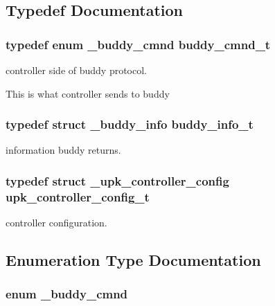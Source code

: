 \subsection{Typedef Documentation}
\subsubsection[{buddy\_\-cmnd\_\-t}]{\setlength{\rightskip}{0pt plus 5cm}typedef enum {\bf \_\-buddy\_\-cmnd}  {\bf buddy\_\-cmnd\_\-t}}\label{group__controller_ga535b2f2f45016f1d808a74f3ea665816}


controller side of buddy protocol. 

This is what controller sends to buddy 
\subsubsection[{buddy\_\-info\_\-t}]{\setlength{\rightskip}{0pt plus 5cm}typedef struct {\bf \_\-buddy\_\-info} {\bf buddy\_\-info\_\-t}}\label{group__controller_ga6036c7d3d9131044bcf5a6f7a79106f5}


information buddy returns. 

\subsubsection[{upk\_\-controller\_\-config\_\-t}]{\setlength{\rightskip}{0pt plus 5cm}typedef struct {\bf \_\-upk\_\-controller\_\-config}  {\bf upk\_\-controller\_\-config\_\-t}}\label{group__controller_ga26d3c211cf53e0cd24f9854b2e6fe495}


controller configuration. 



\subsection{Enumeration Type Documentation}
\subsubsection[{\_\-buddy\_\-cmnd}]{\setlength{\rightskip}{0pt plus 5cm}enum {\bf \_\-buddy\_\-cmnd}}\label{group__controller_ga0d570130f3428734fef617272f44b7c9}


